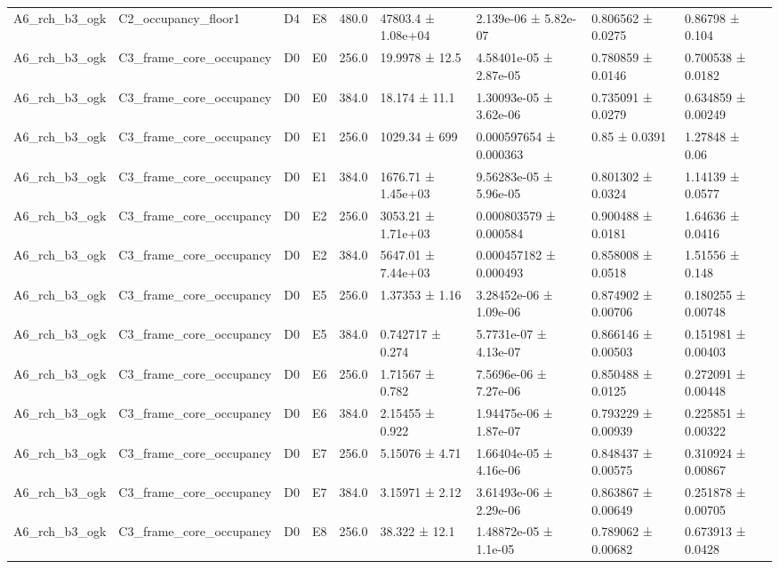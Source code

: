 \begin{table}
\begin{tabular}{lllllllll}
A6\_rch\_b3\_ogk & C2\_occupancy\_floor1 & D4 & E8 & 480.0 & 47803.4 ± 1.08e+04 & 2.139e-06 ± 5.82e-07 & 0.806562 ± 0.0275 & 0.86798 ± 0.104 \\
A6\_rch\_b3\_ogk & C3\_frame\_core\_occupancy & D0 & E0 & 256.0 & 19.9978 ± 12.5 & 4.58401e-05 ± 2.87e-05 & 0.780859 ± 0.0146 & 0.700538 ± 0.0182 \\
A6\_rch\_b3\_ogk & C3\_frame\_core\_occupancy & D0 & E0 & 384.0 & 18.174 ± 11.1 & 1.30093e-05 ± 3.62e-06 & 0.735091 ± 0.0279 & 0.634859 ± 0.00249 \\
A6\_rch\_b3\_ogk & C3\_frame\_core\_occupancy & D0 & E1 & 256.0 & 1029.34 ± 699 & 0.000597654 ± 0.000363 & 0.85 ± 0.0391 & 1.27848 ± 0.06 \\
A6\_rch\_b3\_ogk & C3\_frame\_core\_occupancy & D0 & E1 & 384.0 & 1676.71 ± 1.45e+03 & 9.56283e-05 ± 5.96e-05 & 0.801302 ± 0.0324 & 1.14139 ± 0.0577 \\
A6\_rch\_b3\_ogk & C3\_frame\_core\_occupancy & D0 & E2 & 256.0 & 3053.21 ± 1.71e+03 & 0.000803579 ± 0.000584 & 0.900488 ± 0.0181 & 1.64636 ± 0.0416 \\
A6\_rch\_b3\_ogk & C3\_frame\_core\_occupancy & D0 & E2 & 384.0 & 5647.01 ± 7.44e+03 & 0.000457182 ± 0.000493 & 0.858008 ± 0.0518 & 1.51556 ± 0.148 \\
A6\_rch\_b3\_ogk & C3\_frame\_core\_occupancy & D0 & E5 & 256.0 & 1.37353 ± 1.16 & 3.28452e-06 ± 1.09e-06 & 0.874902 ± 0.00706 & 0.180255 ± 0.00748 \\
A6\_rch\_b3\_ogk & C3\_frame\_core\_occupancy & D0 & E5 & 384.0 & 0.742717 ± 0.274 & 5.7731e-07 ± 4.13e-07 & 0.866146 ± 0.00503 & 0.151981 ± 0.00403 \\
A6\_rch\_b3\_ogk & C3\_frame\_core\_occupancy & D0 & E6 & 256.0 & 1.71567 ± 0.782 & 7.5696e-06 ± 7.27e-06 & 0.850488 ± 0.0125 & 0.272091 ± 0.00448 \\
A6\_rch\_b3\_ogk & C3\_frame\_core\_occupancy & D0 & E6 & 384.0 & 2.15455 ± 0.922 & 1.94475e-06 ± 1.87e-07 & 0.793229 ± 0.00939 & 0.225851 ± 0.00322 \\
A6\_rch\_b3\_ogk & C3\_frame\_core\_occupancy & D0 & E7 & 256.0 & 5.15076 ± 4.71 & 1.66404e-05 ± 4.16e-06 & 0.848437 ± 0.00575 & 0.310924 ± 0.00867 \\
A6\_rch\_b3\_ogk & C3\_frame\_core\_occupancy & D0 & E7 & 384.0 & 3.15971 ± 2.12 & 3.61493e-06 ± 2.29e-06 & 0.863867 ± 0.00649 & 0.251878 ± 0.00705 \\
A6\_rch\_b3\_ogk & C3\_frame\_core\_occupancy & D0 & E8 & 256.0 & 38.322 ± 12.1 & 1.48872e-05 ± 1.1e-05 & 0.789062 ± 0.00682 & 0.673913 ± 0.0428 \\

\end{tabular}
\end{table}
